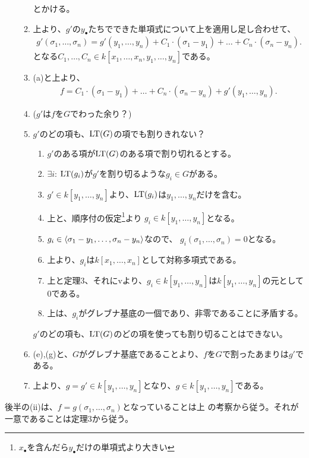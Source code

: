 \begin{myproof}
\begin{enumerate}
\begin{enumerate}
      とかける。
      \item
      上より、$g'$の$y_\bullet$たちでできた単項式について上を適用し足し合わせて、
      \begin{align}
        g'(\sigma_1,\dots,\sigma_n) = g'(y_1,\dots,y_n) + C_1\cdot (\sigma_1-y_1) + \dots + C_n\cdot (\sigma_n-y_n).
      \end{align}
      となる$C_1,\dots,C_n \in k[x_1,\dots,x_n,y_1,\dots,y_n]$である。
      \item
      (a)と上より、
      \begin{align}
        f = C_1 \cdot (\sigma_1-y_1) + \dots + C_n\cdot (\sigma_n-y_n) + g'(y_1,\dots,y_n).
      \end{align}
      \item
      ($g'$は$f$を$G$でわった余り？)
      \item
      $g'$のどの項も、${\rm LT}(G)$の項でも割りきれない？
      \begin{enumerate}
        \item $g'$のある項が${\rm LT}(G)$のある項で割り切れるとする。
        \item $\exists i$: ${\rm LT}(g_i)$が$g'$を割り切るような$g_i \in G$がある。
        \item $g'\in k[y_1,\dots,y_n]$より、${\rm LT}(g_i)$は$y_1,\dots,y_n$だけを含む。
        \item 上と、順序付の仮定\footnote{$x_\bullet$を含んだら$y_\bullet$だけの単項式より大きい}より
        $g_i \in k[y_1,\dots,y_n]$となる。
        \item
        $g_i \in \left\langle \sigma_1-y_1,\dots,\sigma_n-y_n \right\rangle$なので、
        $g_i(\sigma_1,\dots,\sigma_n) = 0$となる。
        \item
        上より、$g_i$は$k[x_1,\dots,x_n]$として対称多項式である。
        \item
        上と定理3、それにvより、$g_i \in k[y_1,\dots,y_n]$は$k[y_1,\dots,y_n]$の元として0である。
        \item
        上は、$g_i$がグレブナ基底の一個であり、非零であることに矛盾する。

      \end{enumerate}
      $g'$のどの項も、${\rm LT}(G)$のどの項を使っても割り切ることはできない。
      \item
      (e),(g)と、$G$がグレブナ基底であることより、$f$を$G$で割ったあまりは$g'$である。
      \item
        上より、$g=g' \in k[y_1,\dots,y_n]$となり、$g\in k[y_1,\dots,y_n]$である。

    \end{enumerate}
  \end{enumerate}
  後半の(ii)は、$f=g(\sigma_1,\dots,\sigma_n)$となっていることは上
  の考察から従う。それが一意であることは定理3から従う。
\end{myproof}

